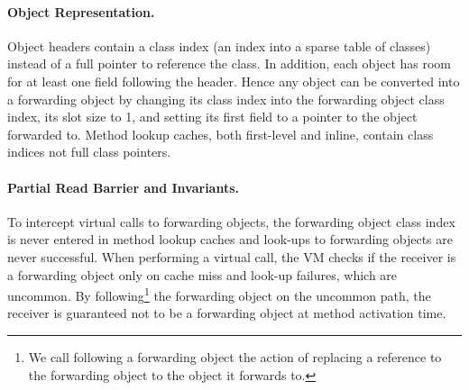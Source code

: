 \documentclass[sigplan,10pt,screen]{acmart}\settopmatter{printfolios=true,printccs=true,printacmref=true}
\begin{document}

\paragraph{Object Representation.}
Object headers contain a class index (an index into a sparse table of classes) instead of a full pointer to reference the class. In addition, each object has room for at least one field following the header. Hence any object can be converted into a forwarding object by changing its class index into the forwarding object class index, its slot size to 1, and setting its first field to a pointer to the object forwarded to. Method lookup caches, both first-level and inline, contain class indices not full class pointers.

\paragraph{Partial Read Barrier and Invariants.} 
To intercept virtual calls to forwarding objects, the forwarding object class index is never entered in method lookup caches and look-ups to forwarding objects are never successful. When performing a virtual call, the VM checks if the receiver is a forwarding object only on cache miss and look-up failures, which are uncommon. By following\footnote{We call following a forwarding object the action of replacing a reference to the forwarding object to the object it forwards to.} the forwarding object on the uncommon path, the receiver is guaranteed not to be a forwarding object at method activation time. 
\end{document}
